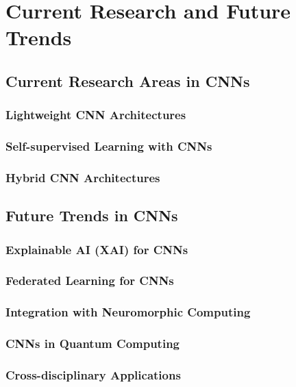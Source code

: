 \chapter{Current Research and Future Trends}\label{chp:7}
\section{Current Research Areas in CNNs}
\subsection{Lightweight CNN Architectures}
\subsection{Self-supervised Learning with CNNs}
\subsection{Hybrid CNN Architectures}

\section{Future Trends in CNNs}
\subsection{Explainable AI (XAI) for CNNs}
\subsection{Federated Learning for CNNs}
\subsection{Integration with Neuromorphic Computing}
\subsection{CNNs in Quantum Computing}
\subsection{Cross-disciplinary Applications}